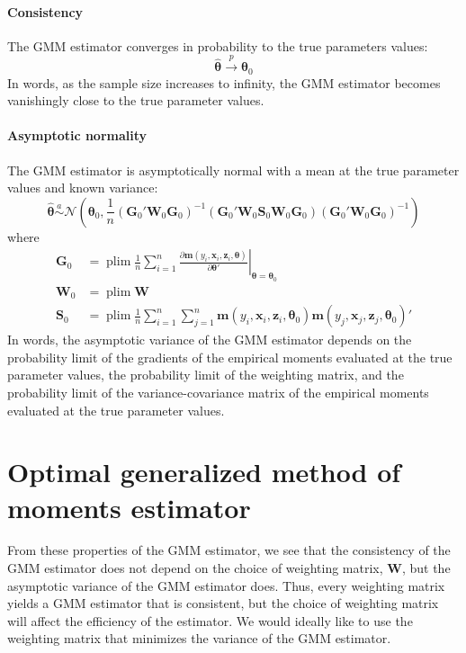 \documentclass[11pt,letterpaper]{article}
\DeclareMathOperator*{\plim}{plim}
\begin{document}
\paragraph{Consistency} The GMM estimator converges in probability to the true parameters values:
$$\widehat{\bm{\theta}} \overset{p}{\rightarrow} \bm{\theta}_0$$
In words, as the sample size increases to infinity, the GMM estimator becomes vanishingly close to the true parameter values.

\paragraph{Asymptotic normality} The GMM estimator is asymptotically normal with a mean at the true parameter values and known variance:
$$\widehat{\bm{\theta}} \overset{a}{\sim} \mathcal{N}\left( \bm{\theta}_0, \frac{1}{n} (\bm{G}_0' \bm{W}_0 \bm{G}_0)^{-1} (\bm{G}_0' \bm{W}_0 \bm{S}_0 \bm{W}_0 \bm{G}_0) (\bm{G}_0' \bm{W}_0 \bm{G}_0)^{-1} \right)$$
where
\begin{align*}
	\bm{G}_0 & = \plim \frac{1}{n} \sum_{i = 1}^n \left. \frac{\partial \bm{m}(y_i, \bm{x}_i, \bm{z}_i, \bm{\theta})}{\partial \bm{\theta}'} \right\vert_{\bm{\theta} = \bm{\theta}_0} \\
	\bm{W}_0 & = \plim \bm{W} \\
	\bm{S}_0 & = \plim \frac{1}{n} \sum_{i = 1}^n \sum_{j = 1}^n \bm{m}(y_i, \bm{x}_i, \bm{z}_i, \bm{\theta}_0) \bm{m}(y_j, \bm{x}_j, \bm{z}_j, \bm{\theta}_0)'
\end{align*}
In words, the asymptotic variance of the GMM estimator depends on the probability limit of the gradients of the empirical moments evaluated at the true parameter values, the probability limit of the weighting matrix, and the probability limit of the variance-covariance matrix of the empirical moments evaluated at the true parameter values.

\section{Optimal generalized method of moments estimator}

From these properties of the GMM estimator, we see that the consistency of the GMM estimator does not depend on the choice of weighting matrix, $\bm{W}$, but the asymptotic variance of the GMM estimator does. Thus, every weighting matrix yields a GMM estimator that is consistent, but the choice of weighting matrix will affect the efficiency of the estimator. We would ideally like to use the weighting matrix that minimizes the variance of the GMM estimator. \\
\end{document}
